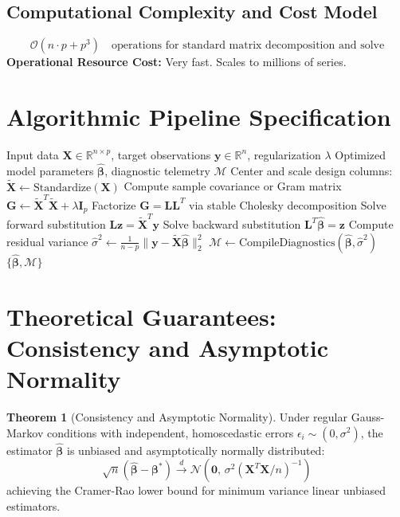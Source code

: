 \documentclass[11pt,a4paper]{article}
\theoremstyle{definition}
\newtheorem{theorem}{\textbf{Theorem}}[section]
\begin{document}
\subsection{Computational Complexity and Cost Model}
\begin{equation}
\mathcal{O}(n \cdot p + p^3) \quad \text{operations for standard matrix decomposition and solve}
\end{equation}
\textbf{Operational Resource Cost:} Very fast. Scales to millions of series.

\section{Algorithmic Pipeline Specification}

\begin{algorithm}[H]
\caption{Exponential smoothing Execution}
\begin{algorithmic}[1]
\Require Input data $\mathbf{X} \in \mathbb{R}^{n \times p}$, target observations $\mathbf{y} \in \mathbb{R}^n$, regularization $\lambda$
\Ensure Optimized model parameters $\hat{\boldsymbol{\beta}}$, diagnostic telemetry $\mathcal{M}$
\State Center and scale design columns: $\tilde{\mathbf{X}} \gets \text{Standardize}(\mathbf{X})$
\State Compute sample covariance or Gram matrix $\mathbf{G} \gets \tilde{\mathbf{X}}^T \tilde{\mathbf{X}} + \lambda \mathbf{I}_p$
\State Factorize $\mathbf{G} = \mathbf{L} \mathbf{L}^T$ via stable Cholesky decomposition
\State Solve forward substitution $\mathbf{L} \mathbf{z} = \tilde{\mathbf{X}}^T \mathbf{y}$
\State Solve backward substitution $\mathbf{L}^T \hat{\boldsymbol{\beta}} = \mathbf{z}$
\State Compute residual variance $\hat{\sigma}^2 \gets \frac{1}{n - p} \| \mathbf{y} - \tilde{\mathbf{X}} \hat{\boldsymbol{\beta}} \|_2^2$
\State $\mathcal{M} \gets \text{CompileDiagnostics}(\hat{\boldsymbol{\beta}}, \hat{\sigma}^2)$
\State \Return $\{\hat{\boldsymbol{\beta}}, \mathcal{M}\}$
\end{algorithmic}
\end{algorithm}

\section{Theoretical Guarantees: Consistency and Asymptotic Normality}

\begin{theorem}[Consistency and Asymptotic Normality]
Under regular Gauss-Markov conditions with independent, homoscedastic errors $\epsilon_i \sim (0, \sigma^2)$, the estimator $\hat{\boldsymbol{\beta}}$ is unbiased and asymptotically normally distributed:
\begin{equation}
\sqrt{n}(\hat{\boldsymbol{\beta}} - \boldsymbol{\beta}^*) \xrightarrow{d} \mathcal{N}\left(\mathbf{0}, \, \sigma^2 (\mathbf{X}^T \mathbf{X} / n)^{-1}\right)
\end{equation}
achieving the Cramer-Rao lower bound for minimum variance linear unbiased estimators.
\end{theorem}
\end{document}
